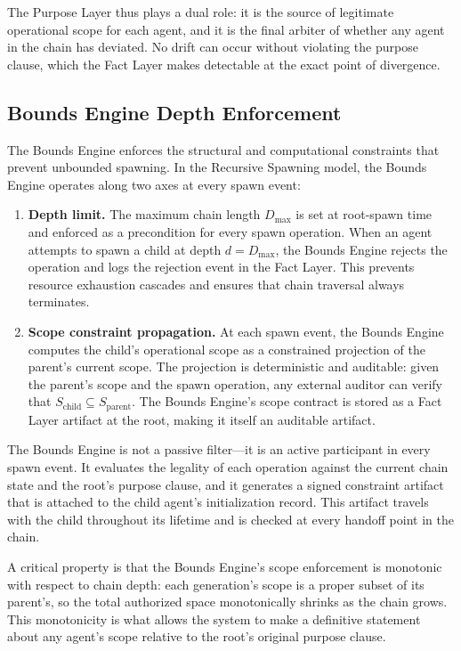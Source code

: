 The Purpose Layer thus plays a dual role: it is the source of legitimate operational scope for each agent, and it is the final arbiter of whether any agent in the chain has deviated. No drift can occur without violating the purpose clause, which the Fact Layer makes detectable at the exact point of divergence.

\subsection{Bounds Engine Depth Enforcement}
\label{sec:bounds_depth}

The Bounds Engine enforces the structural and computational constraints that prevent unbounded spawning. In the Recursive Spawning model, the Bounds Engine operates along two axes at every spawn event:

\begin{enumerate}
    \item \textbf{Depth limit.} The maximum chain length $D_{\max}$ is set at root-spawn time and enforced as a precondition for every spawn operation. When an agent attempts to spawn a child at depth $d = D_{\max}$, the Bounds Engine rejects the operation and logs the rejection event in the Fact Layer. This prevents resource exhaustion cascades and ensures that chain traversal always terminates.
    \item \textbf{Scope constraint propagation.} At each spawn event, the Bounds Engine computes the child's operational scope as a constrained projection of the parent's current scope. The projection is deterministic and auditable: given the parent's scope and the spawn operation, any external auditor can verify that $S_{\text{child}} \subseteq S_{\text{parent}}$. The Bounds Engine's scope contract is stored as a Fact Layer artifact at the root, making it itself an auditable artifact.
\end{enumerate}

The Bounds Engine is not a passive filter—it is an active participant in every spawn event. It evaluates the legality of each operation against the current chain state and the root's purpose clause, and it generates a signed constraint artifact that is attached to the child agent's initialization record. This artifact travels with the child throughout its lifetime and is checked at every handoff point in the chain.

A critical property is that the Bounds Engine's scope enforcement is monotonic with respect to chain depth: each generation's scope is a proper subset of its parent's, so the total authorized space monotonically shrinks as the chain grows. This monotonicity is what allows the system to make a definitive statement about any agent's scope relative to the root's original purpose clause.

